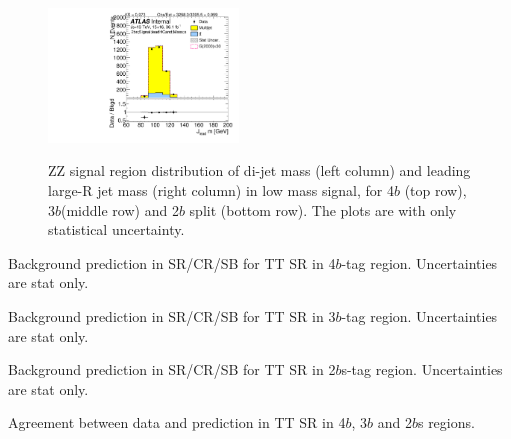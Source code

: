 \begin{figure}[htbp!]
\begin{center}
\includegraphics[width=0.45\textwidth,angle=-90]{figures/boosted/ZZ/Moriond_ZZ_TwoTag_split_Signal_leadHCand_Mass_s.pdf}\\
\end{center}
\caption{ZZ signal region distribution of di-jet mass (left column) and leading large-R jet mass (right column) in low mass signal, for 4$b$ (top row), 3$b$(middle row) and 2$b$ split (bottom row). The plots are with only statistical uncertainty.}
\label{CRSB:ZZSR_Distribution}
\end{figure}

\begin{table}[htbp!]
\begin{center}

\end{center}
\caption{Background prediction in SR/CR/SB for TT SR in 4$b$-tag region. Uncertainties are stat only.}
\label{CRSB:SummaryTable_TT_4b}
\end{table}

\begin{table}[htbp!]
\begin{center}

\end{center}
\caption{Background prediction in SR/CR/SB for TT SR in 3$b$-tag region. Uncertainties are stat only.}
\label{CRSB:SummaryTable_TT_3b}
\end{table}

\begin{table}[htbp!]
\begin{center}

\end{center}
\caption{Background prediction in SR/CR/SB for TT SR in 2$b$s-tag region. Uncertainties are stat only.}
\label{CRSB:SummaryTable_TT_2b}
\end{table}

\begin{table}[htbp!]
\begin{center}

\end{center}
\caption{Agreement between data and prediction in TT SR in 4$b$, 3$b$ and 2$b$s regions.}
\label{CRSB:DataPred_TTSR}
\end{table}


